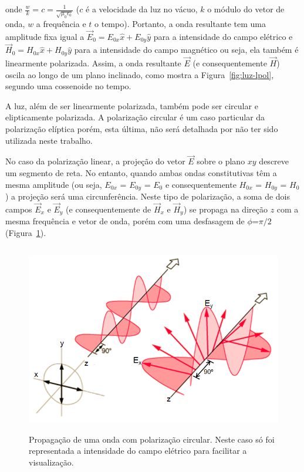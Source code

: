 onde $\frac{w}{k}=c=\frac{1}{\sqrt{\mu_{0}\epsilon_{0}}}$ ($c$ é a
velocidade da luz no vácuo, $k$ o módulo do vetor de onda, $w$ a
frequência e $t$ o tempo). Portanto, a onda resultante tem uma
amplitude fixa igual a $\vec{E}_{0} = E_{0x}\hat{x} + E_{0y}\hat{y}$
para a intensidade do campo elétrico e $\vec{H}_{0} = H_{0x}\hat{x} +
H_{0y}\hat{y}$ para a intensidade do campo magnético ou seja, ela
também é linearmente polarizada. Assim, a onda resultante $\vec{E}$ (e
consequentemente $\vec{H}$) oscila ao longo de um plano inclinado,
como mostra a Figura~\ref{fig:luz-lpol}, segundo uma cossenoide no
tempo.

A luz, além de ser linearmente polarizada, também pode ser circular e
elipticamente polarizada. A polarização circular é um caso particular
da polarização elíptica porém, esta última, não será detalhada por não
ter sido utilizada neste trabalho.

No caso da polarização linear, a projeção do vetor $\vec{E}$ sobre o
plano $xy$ descreve um segmento de reta. No entanto, quando ambas
ondas constitutivas têm a mesma amplitude (ou seja, $E_{0x}$ =
$E_{0y}$ = $E_{0}$ e consequentemente $H_{0x}$ = $H_{0y}$ = $H_{0}$) a
projeção será uma circunferência. Neste tipo de polarização, a soma de
dois campos $\vec{E}_{x}$ e $\vec{E}_{y}$ (e consequentemente de
$\vec{H}_{x}$ e $\vec{H}_{y}$) se propaga na direção $z$ com a mesma
frequência e vetor de onda, porém com uma desfasagem de $\phi$=$\pi/2$
(Figura~\ref{fig:luz-cpol}).

\begin{figure} [h]
  \begin{center}
    \includegraphics[height=235pt,width=350pt]{images/fig_luz-cpol}
    \caption{Propagação de uma onda com polarização circular. Neste
      caso só foi representada a intensidade do campo elétrico para
      facilitar a visualização.\cite{69}}\label{fig:luz-cpol}
  \end{center}
 \end{figure}


